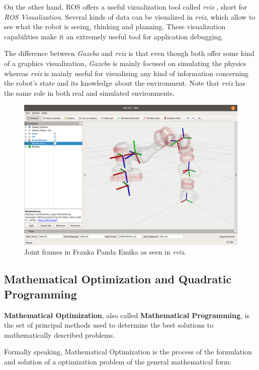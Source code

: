 On the other hand, ROS offers a useful vizualization tool called \textit{rviz} \cite{rviz}, short for \textit{ROS Visualization}. Several kinds of data can be visualized in \textit{rviz}, which allow to see what the robot is seeing, thinking and planning. These visualization capabilities make it an extremely useful tool for application debugging.

The difference between \textit{Gazebo} and \textit{rviz} is that even though both offer some kind of a graphics visualization, \textit{Gazebo} is mainly focused on simulating the physics whereas \textit{rviz} is mainly useful for visualizing any kind of information concerning the robot's state and its knowledge about the environment. Note that \textit{rviz} has the same role in both real and simulated environments.

\begin{figure}[H]
    \caption[rviz]{
        Joint frames in Franka Panda Emika as seen in \textit{rviz}.
    }
    \centering
    \includegraphics[width=\textwidth]{figs/rviz_intro.png}
\end{figure}

\subsection{Mathematical Optimization and Quadratic Programming}
\label{sss:optimizationintro}

\textbf{Mathematical Optimization}, also called \textbf{Mathematical Programming}, is the set of principal methods used to determine the best solutions to mathematically described problems.

Formally speaking, Mathematical Optimization is the process of the formulation and solution of a optimization problem of the general mathematical form:

